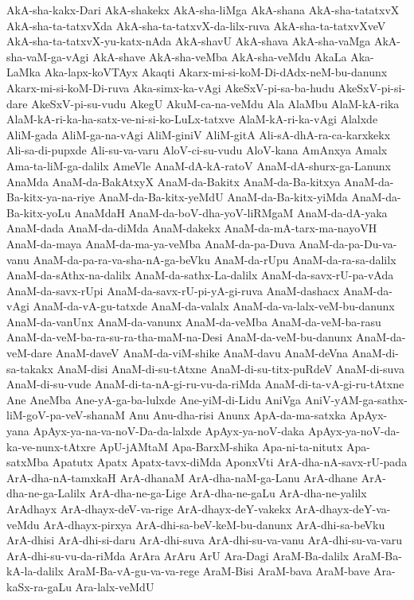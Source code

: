 {AkA-sha-kakx-Dari
AkA-shakekx
AkA-sha-liMga
AkA-shana
AkA-sha-tatatxvX
AkA-sha-ta-tatxvXda
AkA-sha-ta-tatxvX-da-lilx-ruva
AkA-sha-ta-tatxvXveV
AkA-sha-ta-tatxvX-yu-katx-nAda
AkA-shavU
AkA-shava
AkA-sha-vaMga
AkA-sha-vaM-ga-vAgi
AkA-shave
AkA-sha-veMba
AkA-sha-veMdu
AkaLa
Aka-LaMka
Aka-lapx-koVTAyx
Akaqti
Akarx-mi-si-koM-Di-dAdx-neM-bu-danunx
Akarx-mi-si-koM-Di-ruva
Aka-simx-ka-vAgi
AkeSxV-pi-sa-ba-hudu
AkeSxV-pi-si-dare
AkeSxV-pi-su-vudu
AkegU
AkuM-ca-na-veMdu
Ala
AlaMbu
AlaM-kA-rika
AlaM-kA-ri-ka-ha-satx-ve-ni-si-ko-LuLx-tatxve
AlaM-kA-ri-ka-vAgi
Alalxde
AliM-gada
AliM-ga-na-vAgi
AliM-giniV
AliM-gitA
Ali-sA-dhA-ra-ca-karxkekx
Ali-sa-di-pupxde
Ali-su-va-varu
AloV-ci-su-vudu
AloV-kana
AmAnxya
Amalx
Ama-ta-liM-ga-dalilx
AmeVle
AnaM-dA-kA-ratoV
AnaM-dA-shurx-ga-Lanunx
AnaMda
AnaM-da-BakAtxyX
AnaM-da-Bakitx
AnaM-da-Ba-kitxya
AnaM-da-Ba-kitx-ya-na-riye
AnaM-da-Ba-kitx-yeMdU
AnaM-da-Ba-kitx-yiMda
AnaM-da-Ba-kitx-yoLu
AnaMdaH
AnaM-da-boV-dha-yoV-liRMgaM
AnaM-da-dA-yaka
AnaM-dada
AnaM-da-diMda
AnaM-dakekx
AnaM-da-mA-tarx-ma-nayoVH
AnaM-da-maya
AnaM-da-ma-ya-veMba
AnaM-da-pa-Duva
AnaM-da-pa-Du-va-vanu
AnaM-da-pa-ra-va-sha-nA-ga-beVku
AnaM-da-rUpu
AnaM-da-ra-sa-dalilx
AnaM-da-sAthx-na-dalilx
AnaM-da-sathx-La-dalilx
AnaM-da-savx-rU-pa-vAda
AnaM-da-savx-rUpi
AnaM-da-savx-rU-pi-yA-gi-ruva
AnaM-dashacx
AnaM-da-vAgi
AnaM-da-vA-gu-tatxde
AnaM-da-valalx
AnaM-da-va-lalx-veM-bu-danunx
AnaM-da-vanUnx
AnaM-da-vanunx
AnaM-da-veMba
AnaM-da-veM-ba-rasu
AnaM-da-veM-ba-ra-su-ra-tha-maM-na-Desi
AnaM-da-veM-bu-danunx
AnaM-da-veM-dare
AnaM-daveV
AnaM-da-viM-shike
AnaM-davu
AnaM-deVna
AnaM-di-sa-takakx
AnaM-disi
AnaM-di-su-tAtxne
AnaM-di-su-titx-puRdeV
AnaM-di-suva
AnaM-di-su-vude
AnaM-di-ta-nA-gi-ru-vu-da-riMda
AnaM-di-ta-vA-gi-ru-tAtxne
Ane
AneMba
Ane-yA-ga-ba-lulxde
Ane-yiM-di-Lidu
AniVga
AniV-yAM-ga-sathx-liM-goV-pa-veV-shanaM
Anu
Anu-dha-risi
Anunx
ApA-da-ma-satxka
ApAyx-yana
ApAyx-ya-na-va-noV-Da-da-lalxde
ApAyx-ya-noV-daka
ApAyx-ya-noV-da-ka-ve-nunx-tAtxre
ApU-jAMtaM
Apa-BarxM-shika
Apa-ni-ta-nitutx
Apa-satxMba
Apatutx
Apatx
Apatx-tavx-diMda
AponxVti
ArA-dha-nA-savx-rU-pada
ArA-dha-nA-tamxkaH
ArA-dhanaM
ArA-dha-naM-ga-Lanu
ArA-dhane
ArA-dha-ne-ga-Lalilx
ArA-dha-ne-ga-Lige
ArA-dha-ne-gaLu
ArA-dha-ne-yalilx
ArAdhayx
ArA-dhayx-deV-va-rige
ArA-dhayx-deY-vakekx
ArA-dhayx-deY-va-veMdu
ArA-dhayx-pirxya
ArA-dhi-sa-beV-keM-bu-danunx
ArA-dhi-sa-beVku
ArA-dhisi
ArA-dhi-si-daru
ArA-dhi-suva
ArA-dhi-su-va-vanu
ArA-dhi-su-va-varu
ArA-dhi-su-vu-da-riMda
ArAra
ArAru
ArU
Ara-Dagi
AraM-Ba-dalilx
AraM-Ba-kA-la-dalilx
AraM-Ba-vA-gu-va-va-rege
AraM-Bisi
AraM-bava
AraM-bave
Ara-kaSx-ra-gaLu
Ara-lalx-veMdU
}
